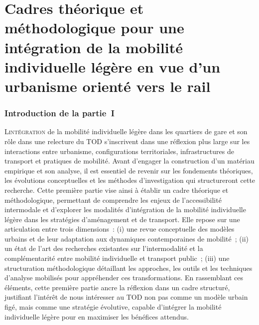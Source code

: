 \renewcommand{\thefigure}{\thechapter.\arabic{figure}} %
\renewcommand{\thetable}{\thechapter.\arabic{figure}}
\setcounter{figure}{0}

\part{Cadres théorique et méthodologique pour une intégration de la mobilité individuelle légère en vue d'un urbanisme orienté vers le rail
    \label{part1:titre}
    }

\cleardoublepage
\section*{Introduction de la partie~I
    \label{part1:introduction}
    }

\lettrine[lines=3, findent=8pt, nindent=0pt]{ L}{intégration} de la mobilité individuelle légère dans les quartiers de gare et son rôle dans une relecture du \acrfull{TOD} s’inscrivent dans une réflexion plus large sur les interactions entre urbanisme, configurations territoriales, infrastructures de transport et pratiques de mobilité. Avant d’engager la construction d'un matériau empirique et son analyse, il est essentiel de revenir sur les fondements théoriques, les évolutions conceptuelles et les méthodes d’investigation qui structureront cette recherche. Cette première partie vise ainsi à établir un cadre théorique et méthodologique, permettant de comprendre les enjeux de l’accessibilité intermodale et d’explorer les modalités d’intégration de la mobilité individuelle légère dans les stratégies d’aménagement et de transport. Elle repose sur une articulation entre trois dimensions~: (i) une revue conceptuelle des modèles urbains et de leur adaptation aux dynamiques contemporaines de mobilité~; (ii) un état de l’art des recherches existantes sur l’intermodalité et la complémentarité entre mobilité individuelle et transport public~; (iii) une structuration méthodologique détaillant les approches, les outils et les techniques d'analyse mobilisés pour appréhender ces transformations. En rassemblant ces éléments, cette première partie ancre la réflexion dans un cadre structuré, justifiant l'intérêt de nous intéresser au \acrshort{TOD} non pas comme un modèle urbain figé, mais comme une stratégie évolutive, capable d’intégrer la mobilité individuelle légère pour en maximiser les bénéfices attendus.%

